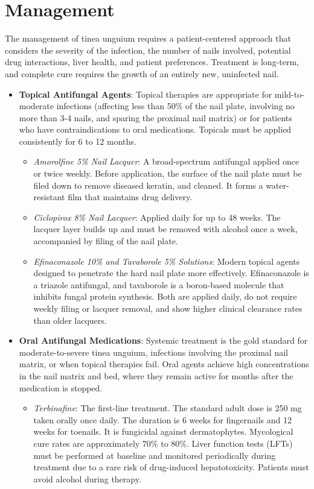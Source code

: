 \section*{Management}
The management of tinea unguium requires a patient-centered approach that considers the severity of the infection, the number of nails involved, potential drug interactions, liver health, and patient preferences. Treatment is long-term, and complete cure requires the growth of an entirely new, uninfected nail.

\begin{itemize}
    \item \textbf{Topical Antifungal Agents}: Topical therapies are appropriate for mild-to-moderate infections (affecting less than 50\% of the nail plate, involving no more than 3-4 nails, and sparing the proximal nail matrix) or for patients who have contraindications to oral medications. Topicals must be applied consistently for 6 to 12 months.
    \begin{itemize}
        \item \textit{Amorolfine 5\% Nail Lacquer}: A broad-spectrum antifungal applied once or twice weekly. Before application, the surface of the nail plate must be filed down to remove diseased keratin, and cleaned. It forms a water-resistant film that maintains drug delivery.
        \item \textit{Ciclopirox 8\% Nail Lacquer}: Applied daily for up to 48 weeks. The lacquer layer builds up and must be removed with alcohol once a week, accompanied by filing of the nail plate.
        \item \textit{Efinaconazole 10\% and Tavaborole 5\% Solutions}: Modern topical agents designed to penetrate the hard nail plate more effectively. Efinaconazole is a triazole antifungal, and tavaborole is a boron-based molecule that inhibits fungal protein synthesis. Both are applied daily, do not require weekly filing or lacquer removal, and show higher clinical clearance rates than older lacquers.
    \end{itemize}
    \item \textbf{Oral Antifungal Medications}: Systemic treatment is the gold standard for moderate-to-severe tinea unguium, infections involving the proximal nail matrix, or when topical therapies fail. Oral agents achieve high concentrations in the nail matrix and bed, where they remain active for months after the medication is stopped.
    \begin{itemize}
        \item \textit{Terbinafine}: The first-line treatment. The standard adult dose is 250 mg taken orally once daily. The duration is 6 weeks for fingernails and 12 weeks for toenails. It is fungicidal against dermatophytes. Mycological cure rates are approximately 70\% to 80\%. Liver function tests (LFTs) must be performed at baseline and monitored periodically during treatment due to a rare risk of drug-induced hepatotoxicity. Patients must avoid alcohol during therapy.

\end{itemize}
\end{itemize}
